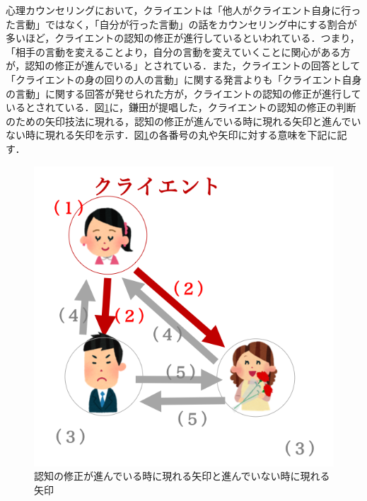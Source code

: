 \documentclass[shuuron]{kuee}
\begin{document}
心理カウンセリングにおいて，クライエントは「他人がクライエント自身に行った言動」ではなく，「自分が行った言動」の話をカウンセリング中にする割合が多いほど，クライエントの認知の修正が進行しているといわれている．つまり，「相手の言動を変えることより，自分の言動を変えていくことに関心がある方が，認知の修正が進んでいる」\cite{zokad}とされている．また，クライエントの回答として「クライエントの身の回りの人の言動」に関する発言よりも「クライエント自身の言動」に関する回答が発せられた方が，クライエントの認知の修正が進行しているとされている．図\ref{fig:arrow}に，鎌田\cite{鎌田穣2002臨床}が提唱した，クライエントの認知の修正の判断のための矢印技法に現れる，認知の修正が進んでいる時に現れる矢印と進んでいない時に現れる矢印を示す．図\ref{fig:arrow}の各番号の丸や矢印に対する意味を下記に記す．

\begin{figure}
  \begin{center}
    \includegraphics[width=\linewidth]{arrow.png}
  \end{center}
  \caption{認知の修正が進んでいる時に現れる矢印と進んでいない時に現れる矢印}
  \label{fig:arrow}
\end{figure}
\end{document}
